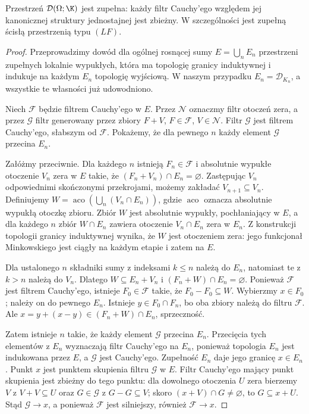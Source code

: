 \begin{twierdzenie}
\label{thm:D-complete18}
Przestrzeń $\mathcal D(\Omega;\K)$ jest zupełna:
każdy filtr Cauchy'ego względem jej kanonicznej struktury
jednostajnej jest zbieżny. W szczególności jest zupełną
ścisłą przestrzenią typu $(LF)$.
\end{twierdzenie}
\begin{proof}
Przeprowadzimy dowód dla ogólnej rosnącej sumy
$E=\bigcup_nE_n$ przestrzeni zupełnych lokalnie wypukłych,
która ma topologię granicy induktywnej i indukuje na
każdym $E_n$ topologię wyjściową. W naszym przypadku
$E_n=\mathcal D_{K_n}$, a wszystkie te własności już
udowodniono.

Niech $\mathcal F$ będzie filtrem Cauchy'ego w $E$.
Przez $\mathcal N$ oznaczmy filtr otoczeń zera, a przez
$\mathcal G$ filtr generowany przez zbiory $F+V$,
$F\in\mathcal F$, $V\in\mathcal N$. Filtr $\mathcal G$
jest filtrem Cauchy'ego, słabszym od $\mathcal F$.
Pokażemy, że dla pewnego $n$ każdy element $\mathcal G$
przecina $E_n$.

Załóżmy przeciwnie. Dla każdego $n$ istnieją
$F_n\in\mathcal F$ i absolutnie wypukłe otoczenie
$V_n$ zera w $E$ takie, że
$(F_n+V_n)\cap E_n=\varnothing$. Zastępując $V_n$
odpowiednimi skończonymi przekrojami, możemy zakładać
$V_{n+1}\subseteq V_n$. Definiujemy
$W=\operatorname{aco}(\bigcup_n(V_n\cap E_n))$,
gdzie $\operatorname{aco}$ oznacza absolutnie wypukłą
otoczkę zbioru. Zbiór $W$ jest absolutnie wypukły,
pochłaniający w $E$, a dla każdego $n$ zbiór
$W\cap E_n$ zawiera otoczenie $V_n\cap E_n$ zera w $E_n$.
Z konstrukcji topologii granicy induktywnej wynika, że
$W$ jest otoczeniem zera: jego funkcjonał Minkowskiego
jest ciągły na każdym etapie i zatem na $E$.

Dla ustalonego $n$ składniki sumy z indeksami $k\le n$
należą do $E_n$, natomiast te z $k>n$ należą do $V_n$.
Dlatego $W\subseteq E_n+V_n$ i
$(F_n+W)\cap E_n=\varnothing$.
Ponieważ $\mathcal F$ jest filtrem Cauchy'ego, istnieje
$F_0\in\mathcal F$ takie, że $F_0-F_0\subseteq W$.
Wybierzmy $x\in F_0$; należy on do pewnego $E_n$.
Istnieje $y\in F_0\cap F_n$, bo oba zbiory należą do
filtru $\mathcal F$. Ale
$x=y+(x-y)\in(F_n+W)\cap E_n$, sprzeczność.

Zatem istnieje $n$ takie, że każdy element $\mathcal G$
przecina $E_n$. Przecięcia tych elementów z $E_n$
wyznaczają filtr Cauchy'ego na $E_n$, ponieważ topologia
$E_n$ jest indukowana przez $E$, a $\mathcal G$
jest Cauchy'ego. Zupełność $E_n$ daje jego granicę
$x\in E_n$. Punkt $x$ jest punktem skupienia filtru
$\mathcal G$ w $E$. Filtr Cauchy'ego mający punkt skupienia
jest zbieżny do tego punktu: dla dowolnego otoczenia
$U$ zera bierzemy $V$ z $V+V\subseteq U$ oraz
$G\in\mathcal G$ z $G-G\subseteq V$; skoro
$(x+V)\cap G\ne\varnothing$, to $G\subseteq x+U$.
Stąd $\mathcal G\to x$, a ponieważ $\mathcal F$ jest
silniejszy, również $\mathcal F\to x$.
\end{proof}

